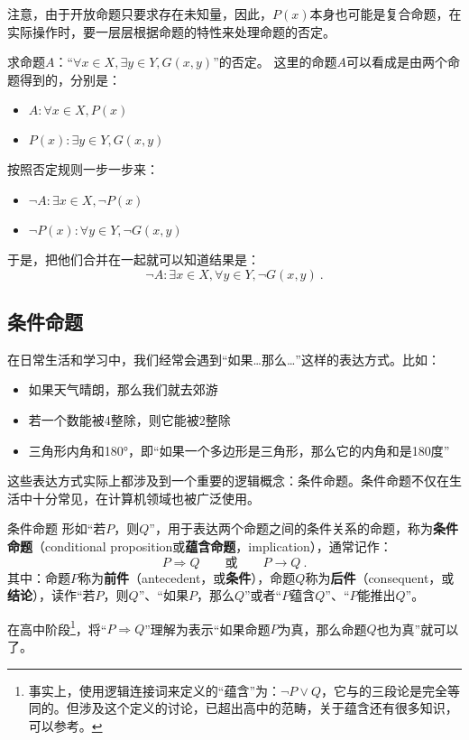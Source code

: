 注意，由于开放命题只要求存在未知量，因此，$P(x)$本身也可能是复合命题，在实际操作时，要一层层根据命题的特性来处理命题的否定。
\begin{exercise}{求命题$A$：“$\forall x\in X,\exists y\in Y,G(x,y)$”的否定。}
这里的命题$A$可以看成是由两个命题得到的，分别是：
\begin{itemize}
\item $A:\forall x\in X,P(x)$
\item $P(x):\exists y\in Y,G(x,y)$
\end{itemize}
按照否定规则一步一步来：
\begin{itemize}
\item $\lnot A:\exists x\in X,\lnot P(x)$
\item $\lnot P(x):\forall y\in Y,\lnot G(x,y)$
\end{itemize}
于是，把他们合并在一起就可以知道结果是：
$$
\lnot A:\exists x\in X,\forall y\in Y,\lnot G(x,y)~.
$$
\end{exercise}

\subsection{条件命题}\label{sub_HsCoPr_1}

在日常生活和学习中，我们经常会遇到“如果…那么…”这样的表达方式。比如：
\begin{itemize}
\item 如果天气晴朗，那么我们就去郊游
\item 若一个数能被4整除，则它能被2整除
\item 三角形内角和180°，即“如果一个多边形是三角形，那么它的内角和是180度”
\end{itemize}
这些表达方式实际上都涉及到一个重要的逻辑概念：条件命题。条件命题不仅在生活中十分常见，在计算机领域也被广泛使用。

\begin{definition}{条件命题}\label{def_HsCoPr_3}
形如“若$P$，则$Q$”，用于表达两个命题之间的条件关系的命题，称为\textbf{条件命题}（conditional proposition或\textbf{蕴含命题}，implication），通常记作：
\begin{equation}
P\Rightarrow Q\qquad\text{或}\qquad P\rightarrow Q~.
\end{equation}
其中：命题$P$称为\textbf{前件}（antecedent，或\textbf{条件}），命题$Q$称为\textbf{后件}（consequent，或\textbf{结论}），读作“若$P$，则$Q$”、“如果$P$，那么$Q$”或者“$P$蕴含$Q$”、“$P$能推出$Q$”。
\end{definition}

在高中阶段\footnote{事实上，使用逻辑连接词来定义的“蕴含”为：$\lnot P\lor Q$，它与的三段论是完全等同的。但涉及这个定义的讨论，已超出高中的范畴，关于蕴含还有很多知识，可以参考。}，将“$P\Rightarrow Q$”理解为表示“如果命题$P$为真，那么命题$Q$也为真”就可以了。

